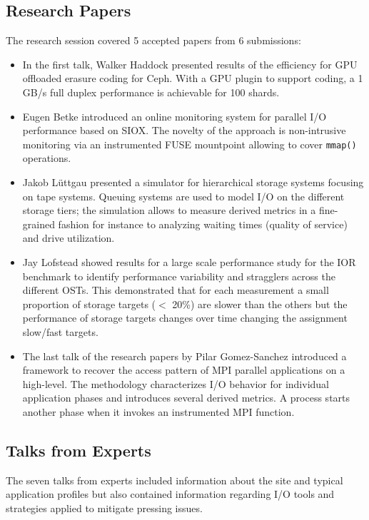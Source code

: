 \documentclass{llncs}
\begin{document}
\subsection{Research Papers}

The research session covered 5 accepted papers from 6 submissions:
\begin{itemize}
\item In the first talk, Walker Haddock presented results of the efficiency for GPU offloaded erasure coding for Ceph.
With a GPU plugin to support coding, a 1 GB/s full duplex performance is achievable for 100 shards.
\item Eugen Betke introduced an online monitoring system for parallel I/O performance based on SIOX.
The novelty of the approach is non-intrusive monitoring via an instrumented FUSE mountpoint allowing to cover \texttt{mmap()} operations.
\item Jakob Lüttgau presented a simulator for hierarchical storage systems focusing on tape systems.
Queuing systems are used to model I/O on the different storage tiers;
the simulation allows to measure derived metrics in a fine-grained fashion for instance to analyzing waiting times (quality of service) and drive utilization.
\item Jay Lofstead showed results for a large scale performance study for the IOR benchmark to identify performance variability and stragglers across the different OSTs.
This demonstrated that for each measurement a small proportion of storage targets ($<$ 20\%) are slower than the others but the performance of storage targets changes over time changing the assignment slow/fast targets.
\item The last talk of the research papers by Pilar Gomez-Sanchez introduced a framework to recover the access pattern of MPI parallel applications on a high-level.
The methodology characterizes I/O behavior for individual application phases and introduces several derived metrics.
A process starts another phase when it invokes an instrumented MPI function.
\end{itemize}

\subsection{Talks from Experts}

The seven talks from experts included information about the site and typical
application profiles but also contained information regarding I/O tools and strategies applied to mitigate pressing issues.
\end{document}
